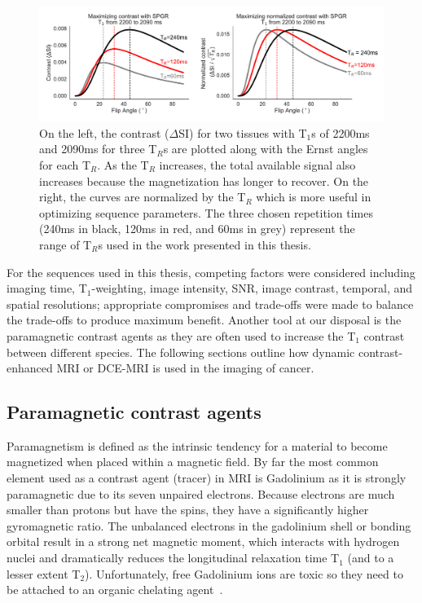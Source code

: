\begin{figure}[htbp]
   \centering
   \includegraphics[width=\textwidth]{intro/intro-images/TR_FA_T1_optimization.pdf}
   \caption{On the left, the contrast ($\Delta$SI) for two tissues with T$_1$s of 2200ms and 2090ms for three T$_R$s are plotted along with the Ernst angles for each T$_R$. As the T$_R$ increases, the total available signal also increases because the magnetization has longer to recover. On the right, the curves are normalized by the T$_R$ which is more useful in optimizing sequence parameters. The three chosen repetition times (240ms in black, 120ms in red, and 60ms in grey) represent the range of T$_R$s used in the work presented in this thesis.}
   \label{optimizing_TR}
\end{figure}

For the sequences used in this thesis, competing factors were considered including imaging time, T$_1$-weighting, image intensity, SNR, image contrast, temporal, and spatial resolutions; appropriate compromises and trade-offs were made to balance the trade-offs to produce maximum benefit. 
Another tool at our disposal is the paramagnetic contrast agents as they are often used to increase the T$_1$ contrast between different species.
The following sections outline how dynamic contrast-enhanced MRI or \acs{DCE-MRI} is used in the imaging of cancer.

\subsection{Paramagnetic contrast agents}

Paramagnetism is defined as the intrinsic tendency for a material to become magnetized when placed within a magnetic field.
By far the most common element used as a contrast agent (tracer) in MRI is Gadolinium as it is strongly paramagnetic due to its seven unpaired electrons.
Because electrons are much smaller than protons but have the spins, they have a significantly higher gyromagnetic ratio.
The unbalanced electrons in the gadolinium shell or bonding orbital result in a strong net magnetic moment, which interacts with hydrogen nuclei and dramatically reduces the longitudinal relaxation time T$_1$ (and to a lesser extent T$_2$).
Unfortunately, free Gadolinium ions are toxic so they need to be attached to an organic chelating agent~\cite{DeLeonRodriguez:2015bl}.

